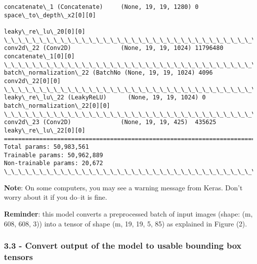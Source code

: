 \documentclass[11pt]{article}
\begin{document}
\begin{Verbatim}[commandchars=\\\{\}]
concatenate\_1 (Concatenate)     (None, 19, 19, 1280) 0           space\_to\_depth\_x2[0][0]          
                                                                 leaky\_re\_lu\_20[0][0]             
\_\_\_\_\_\_\_\_\_\_\_\_\_\_\_\_\_\_\_\_\_\_\_\_\_\_\_\_\_\_\_\_\_\_\_\_\_\_\_\_\_\_\_\_\_\_\_\_\_\_\_\_\_\_\_\_\_\_\_\_\_\_\_\_\_\_\_\_\_\_\_\_\_\_\_\_\_\_\_\_\_\_\_\_\_\_\_\_\_\_\_\_\_\_\_\_\_\_
conv2d\_22 (Conv2D)              (None, 19, 19, 1024) 11796480    concatenate\_1[0][0]              
\_\_\_\_\_\_\_\_\_\_\_\_\_\_\_\_\_\_\_\_\_\_\_\_\_\_\_\_\_\_\_\_\_\_\_\_\_\_\_\_\_\_\_\_\_\_\_\_\_\_\_\_\_\_\_\_\_\_\_\_\_\_\_\_\_\_\_\_\_\_\_\_\_\_\_\_\_\_\_\_\_\_\_\_\_\_\_\_\_\_\_\_\_\_\_\_\_\_
batch\_normalization\_22 (BatchNo (None, 19, 19, 1024) 4096        conv2d\_22[0][0]                  
\_\_\_\_\_\_\_\_\_\_\_\_\_\_\_\_\_\_\_\_\_\_\_\_\_\_\_\_\_\_\_\_\_\_\_\_\_\_\_\_\_\_\_\_\_\_\_\_\_\_\_\_\_\_\_\_\_\_\_\_\_\_\_\_\_\_\_\_\_\_\_\_\_\_\_\_\_\_\_\_\_\_\_\_\_\_\_\_\_\_\_\_\_\_\_\_\_\_
leaky\_re\_lu\_22 (LeakyReLU)      (None, 19, 19, 1024) 0           batch\_normalization\_22[0][0]     
\_\_\_\_\_\_\_\_\_\_\_\_\_\_\_\_\_\_\_\_\_\_\_\_\_\_\_\_\_\_\_\_\_\_\_\_\_\_\_\_\_\_\_\_\_\_\_\_\_\_\_\_\_\_\_\_\_\_\_\_\_\_\_\_\_\_\_\_\_\_\_\_\_\_\_\_\_\_\_\_\_\_\_\_\_\_\_\_\_\_\_\_\_\_\_\_\_\_
conv2d\_23 (Conv2D)              (None, 19, 19, 425)  435625      leaky\_re\_lu\_22[0][0]             
==================================================================================================
Total params: 50,983,561
Trainable params: 50,962,889
Non-trainable params: 20,672
\_\_\_\_\_\_\_\_\_\_\_\_\_\_\_\_\_\_\_\_\_\_\_\_\_\_\_\_\_\_\_\_\_\_\_\_\_\_\_\_\_\_\_\_\_\_\_\_\_\_\_\_\_\_\_\_\_\_\_\_\_\_\_\_\_\_\_\_\_\_\_\_\_\_\_\_\_\_\_\_\_\_\_\_\_\_\_\_\_\_\_\_\_\_\_\_\_\_

    \end{Verbatim}

    \textbf{Note}: On some computers, you may see a warning message from
Keras. Don't worry about it if you do--it is fine.

\textbf{Reminder}: this model converts a preprocessed batch of input
images (shape: (m, 608, 608, 3)) into a tensor of shape (m, 19, 19, 5,
85) as explained in Figure (2).

    \hypertarget{convert-output-of-the-model-to-usable-bounding-box-tensors}{%
\subsubsection{3.3 - Convert output of the model to usable bounding box
tensors}\label{convert-output-of-the-model-to-usable-bounding-box-tensors}}
\end{document}
